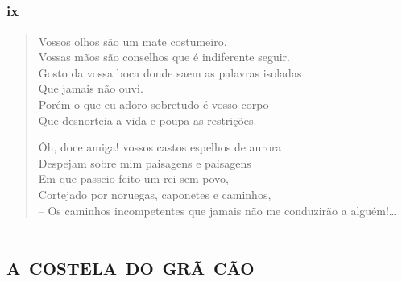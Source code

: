 \chapter*{}
\section*{ix}

\begin{verse}
Vossos olhos são um mate costumeiro.\\
Vossas mãos são conselhos que é indiferente seguir.\\
Gosto da vossa boca donde saem as palavras isoladas\\
Que jamais não ouvi.\\
Porém o que eu adoro sobretudo é vosso corpo\\
Que desnorteia a vida e poupa as restrições.

Ôh, doce amiga! vossos castos espelhos de aurora\\
Despejam sobre mim paisagens e paisagens\\
Em que passeio feito um rei sem povo,\\
Cortejado por noruegas, caponetes e caminhos,\\
-- Os caminhos incompetentes que jamais não me conduzirão a alguém!\ldots{}\\
\end{verse}

\movetooddpage
{}
\part{\textsc{a costela do grã cão}}
\removeepigraph


